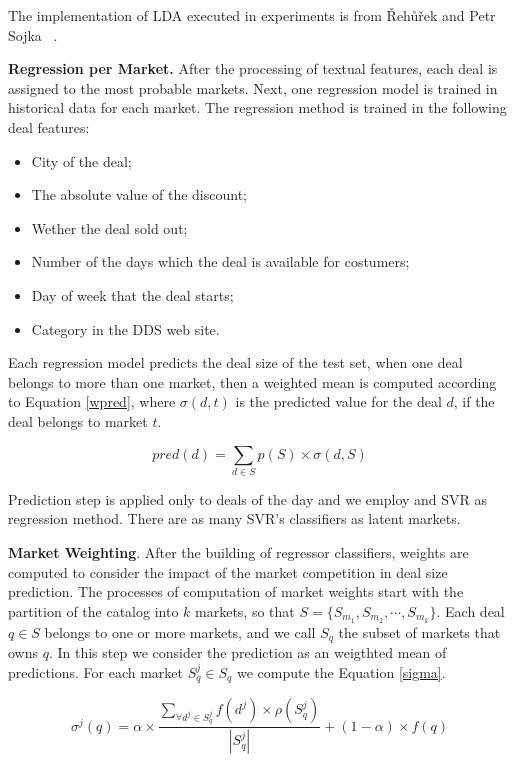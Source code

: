 \documentclass{acm_proc_article-sp}
\begin{document}
The implementation of LDA executed in experiments is from 
{\v R}eh{\r u}{\v r}ek and Petr Sojka ~\cite{rehureklrec}.

\textbf{Regression per Market.} After the processing of textual features, 
each deal is assigned to 
the most probable markets. Next, one regression model is trained 
in historical data for each market. The regression method is trained in the 
following deal features:

\begin{itemize}
    \item City of the deal;
    \item The absolute value of the discount;
    \item Wether the deal sold out;
    \item Number of the days which the deal is available for costumers;
    \item Day of week that the deal starts;
    \item Category in the DDS web site.
\end{itemize}


Each regression model predicts 
the deal size of the test set, when one deal belongs to more than one 
market, then a weighted mean is computed according to Equation \ref{wpred}, 
where $\sigma(d,t)$ is the predicted value for the deal $d$, if the deal 
belongs to market $t$.

\begin{equation}
    pred(d) = \sum_{d \in S} p(S)\times \sigma(d,S)
    \label{wpred}
\end{equation}

Prediction step is applied 
only to deals of the day and we employ and SVR as 
regression method. 
There are as many SVR's classifiers as latent markets.

\textbf{Market Weighting}. After the building of regressor classifiers, 
weights are computed to consider the impact of the market competition in deal size 
prediction. The processes of computation of market weights start with the partition of 
the catalog into $k$ markets, so that $S =\{S_{m_1},S_{m_2},\cdots,S_{m_k}\}$.
Each deal $q \in S$ belongs to one or more markets, and we call $S_q$ the 
subset of markets that owns $q$. In this step we consider the 
prediction as an weigthted mean of predictions. For each market $S^{j}_q \in S_q$ 
we compute the Equation \ref{sigma}.

\begin{equation}
    \sigma^j(q) = \alpha \times \frac{\sum\limits_{\forall d^j \in S^j_q} f(d^j) \times \rho(S^j_q)}{|S^j_q|} + (1 - \alpha) \times f(q)
    \label{sigma}
\end{equation}
\end{document}
